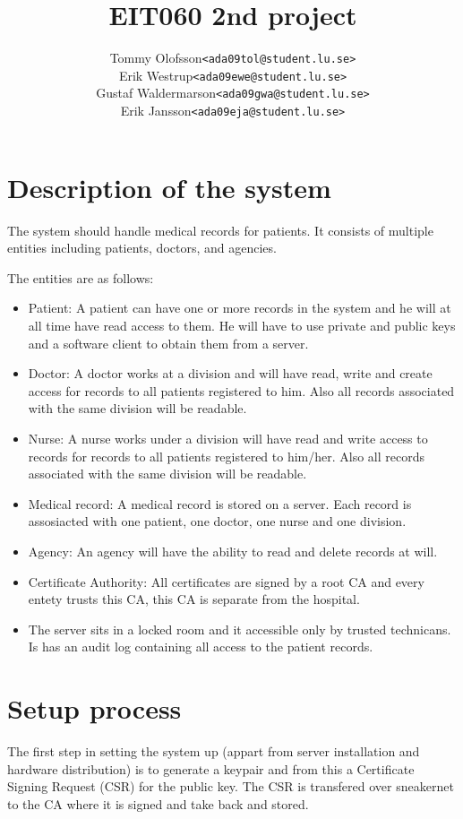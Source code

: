 \documentclass[10pt, a4paper]{article}
\title{EIT060 2nd project}
\date{}
\author{
	\begin{tabular}{l l}
		Tommy Olofsson & \texttt{<ada09tol@student.lu.se>}\\
		Erik Westrup & \texttt{<ada09ewe@student.lu.se>}\\
		Gustaf Waldermarson & \texttt{<ada09gwa@student.lu.se>}\\
		Erik Jansson & \texttt{<ada09eja@student.lu.se>}
	\end{tabular}
}
\begin{document}
\begin{titlepage}
\maketitle
\begin{center}
\end{center}

\thispagestyle{empty}
\end{titlepage}
\setcounter{page}{2}
\section{Description of the system}
The system should handle medical records for patients. It consists of multiple entities including patients, doctors, and agencies. %

The entities are as follows:
\begin{itemize}
\item Patient: A patient can have one or more records in the system and he will at all time have read access to them. He will have to use private and public keys and a software client to obtain them from a server. 
\item Doctor: A doctor works at a division and will have read, write and create access for records to all patients registered to him. Also all records associated with the same division will be readable.
\item Nurse: A nurse works under a division will have read and write access to records for records to all patients registered to him/her. Also all records associated with the same division will be readable.
\item Medical record: A medical record is stored on a server. Each record is assosiacted with one patient, one doctor, one nurse and one division.
\item Agency: An agency will have the ability to read and delete records at will.
\item Certificate Authority: All certificates are signed by a root CA and every entety trusts this CA, this CA is
separate from the hospital.
\item The server sits in a locked room and it accessible only by trusted technicans. Is has an audit log containing all access to the patient records.
\end{itemize}

\section{Setup process}
The first step in setting the system up (appart from server installation and hardware distribution) is to generate a keypair and from this a Certificate Signing Request (CSR) for the public key. The CSR is transfered over sneakernet to the CA where it is signed and take back and stored. 
\end{document}
